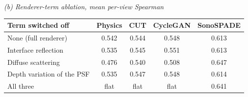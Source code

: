 \begin{table}[tp]
\vspace{6pt}
\textit{(b) Renderer-term ablation, mean per-view Spearman}\\[2pt]
\begin{tabular}{@{}lcccc@{}}
\toprule
Term switched off & Physics & CUT & CycleGAN & SonoSPADE \\
\midrule
None (full renderer) & 0.542 & 0.544 & 0.548 & 0.613 \\
Interface reflection & 0.535 & 0.545 & 0.551 & 0.613 \\
Diffuse scattering & 0.476 & 0.540 & 0.508 & 0.647 \\
Depth variation of the PSF & 0.535 & 0.547 & 0.548 & 0.614 \\
All three & flat & flat & flat & 0.641 \\
\bottomrule
\end{tabular}
\end{table}
